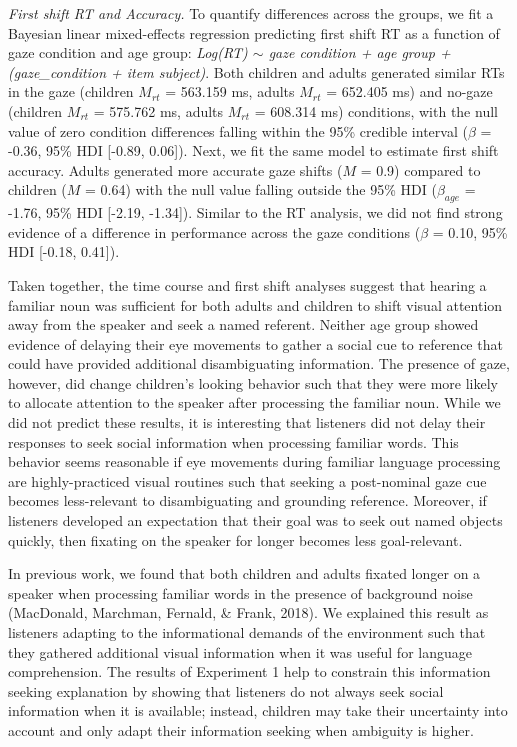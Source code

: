 \documentclass[10pt, letterpaper]{article}
\begin{document}
\emph{First shift RT and Accuracy.} To quantify differences across the
groups, we fit a Bayesian linear mixed-effects regression predicting
first shift RT as a function of gaze condition and age group:
\emph{Log(RT) \(\sim\) gaze condition + age group + (gaze\_condition +
item \textbar{} subject)}. Both children and adults generated similar
RTs in the gaze (children \(M_{rt}\) = 563.159 ms, adults \(M_{rt}\) =
652.405 ms) and no-gaze (children \(M_{rt}\) = 575.762 ms, adults
\(M_{rt}\) = 608.314 ms) conditions, with the null value of zero
condition differences falling within the 95\% credible interval
(\(\beta\) = -0.36, 95\% HDI {[}-0.89, 0.06{]}). Next, we fit the same
model to estimate first shift accuracy. Adults generated more accurate
gaze shifts (\(M\) = 0.9) compared to children (\(M\) = 0.64) with the
null value falling outside the 95\% HDI (\(\beta_{age}\) = -1.76, 95\%
HDI {[}-2.19, -1.34{]}). Similar to the RT analysis, we did not find
strong evidence of a difference in performance across the gaze
conditions (\(\beta\) = 0.10, 95\% HDI {[}-0.18, 0.41{]}).

Taken together, the time course and first shift analyses suggest that
hearing a familiar noun was sufficient for both adults and children to
shift visual attention away from the speaker and seek a named referent.
Neither age group showed evidence of delaying their eye movements to
gather a social cue to reference that could have provided additional
disambiguating information. The presence of gaze, however, did change
children's looking behavior such that they were more likely to allocate
attention to the speaker after processing the familiar noun. While we
did not predict these results, it is interesting that listeners did not
delay their responses to seek social information when processing
familiar words. This behavior seems reasonable if eye movements during
familiar language processing are highly-practiced visual routines such
that seeking a post-nominal gaze cue becomes less-relevant to
disambiguating and grounding reference. Moreover, if listeners developed
an expectation that their goal was to seek out named objects quickly,
then fixating on the speaker for longer becomes less goal-relevant.

In previous work, we found that both children and adults fixated longer
on a speaker when processing familiar words in the presence of
background noise (MacDonald, Marchman, Fernald, \& Frank, 2018). We
explained this result as listeners adapting to the informational demands
of the environment such that they gathered additional visual information
when it was useful for language comprehension. The results of Experiment
1 help to constrain this information seeking explanation by showing that
listeners do not always seek social information when it is available;
instead, children may take their uncertainty into account and only adapt
their information seeking when ambiguity is higher.
\end{document}
